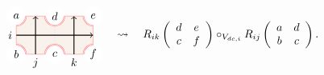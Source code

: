 \begin{equation}
    \begin{tikzpicture}[scale=0.6, baseline=(x.base)]  \node (x) at (0,0) {\vphantom{x}};

        \draw[color=red!50, fill=brown!10] (-1,-1) rectangle (3,1);
        \draw[color=red!50, dotted] (1,-1) -- (1,1);

        \fill[color=white] (-1,1) circle (0.5);  \node (a) at (-1,1) {$a$};
        \draw[draw=red!50, double]  (-1,0.5) arc (-90:0:0.5);
        \fill[color=white] (-1,-1) circle (0.5);  \node (b) at (-1,-1) {$b$};
        \draw[draw=red!50, double]  (-1,-0.5) arc (90:0:0.5);
        \fill[color=white] (1,-1) circle (0.5);  \node (c) at (1,-1) {$c$};
        \draw[draw=red!50, double]  (1.5,-1) arc (0:180:0.5);
        \fill[color=white] (1,1) circle (0.5);  \node (d) at (1,1) {$d$};
        \draw[draw=red!50, double]  (1.5,1) arc (0:-180:0.5);
        \fill[color=white] (3,-1) circle (0.5);  \node (f) at (3,-1) {$f$};
        \draw[draw=red!50, double]  (3,-0.5) arc (90:180:0.5);
        \fill[color=white] (3,1) circle (0.5);  \node (e) at (3,1) {$e$};
        \draw[draw=red!50, double]  (3,0.5) arc (-90:-180:0.5);

        \draw[thick, ->] (-1,0) node[left] {$i$} -- (3,0);
        \draw[thick, ->] (0,-1) node[below] {$j$} -- (0,1);
        \draw[thick, ->] (2,-1) node[below] {$k$} -- (2,1);

    \end{tikzpicture}
\quad \rightsquigarrow \quad
R_{ik}\left(%
  \begin{array}{cc}
        d & e\\
        c & f
  \end{array}%
\right)
  \circ_{V_{dc,i}}
R_{ij}\left(%
  \begin{array}{cc}
        a & d\\
        b & c
  \end{array}%
\right).
\end{equation}

